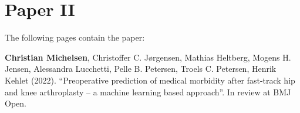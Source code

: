 \chapter{Paper II}
\label{chapter:hospital}

The following pages contain the paper:
\vspace*{1cm}


\textbf{Christian Michelsen}, Christoffer C. Jørgensen, Mathias Heltberg, Mogens H. Jensen, Alessandra Lucchetti, Pelle B. Petersen, Troels C. Petersen, Henrik Kehlet (2022). ``Preoperative prediction of medical morbidity after fast-track hip and knee arthroplasty -- a machine learning based approach''. In review at BMJ Open.


\clearpage
